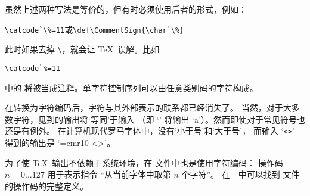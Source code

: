 \documentclass{book}
\begin{document}
虽然上述两种写法是等价的，但有时必须使用后者的形式，例如：
\begin{disp}\verb>\catcode`\%=11>\quad 或\quad \verb>\def\CommentSign{\char`\%}>\end{disp}
此时如果去掉 \verb-\-，就会让 \TeX\ 误解。比如
\begin{verbatim}
\catcode`%=11
\end{verbatim}
中的  将被当成注释。单字符控制序列可以由任意类别码的字符构成。

在转换为字符编码后，字符与其外部表示的联系都已经消失了。
当然，对于大多数字符，见到的输出将`等同'于输入%
（即 `' 将输出 `a'）。然而即使对于常见符号也还是有例外。
在计算机现代罗马字体中，没有`小于号'和`大于号'，
%
而输入 `\verb.<>.' 得到的输出是 `{\font\cmr=cmr10 \cmr<>}'。

为了使 \TeX\ 输出不依赖于系统环境，在  文件中也是使用字符编码：
操作码 $n=0\ldots127$ 用于表示指令 “从当前字体中取第 $n$ 个字符”。
在~\cite{Knuth:TeXprogram}~中可以找到  文件的操作码的完整定义。

\end{document}
